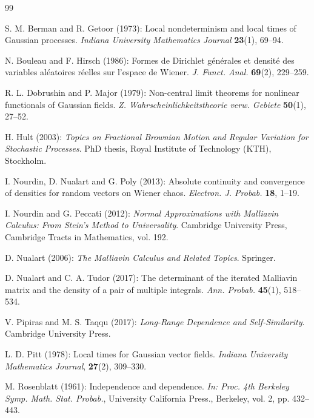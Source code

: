 \documentclass[a4paper,10pt]{article}
\theoremstyle{definition}
\theoremstyle{plain}
\newcommand\1{\mathbbm{1}}
\begin{document}
\begin{thebibliography}{99}

\rm  S. M. Berman and R. Getoor  (1973):
\rm Local nondeterminism and local times of Gaussian processes. 
\rm {\it Indiana University Mathematics Journal}  {\bf 23}(1), 69--94.
  
\rm N. Bouleau and F. Hirsch (1986):
\rm Formes de Dirichlet générales et densité des variables aléatoires réelles sur l’espace de Wiener.
\rm {\it J. Funct. Anal.} {\bf 69}(2), 229--259.

\rm R. L. Dobrushin and P. Major (1979): 
\rm Non-central limit theorems for nonlinear functionals of Gaussian fields.  
\rm {\it Z. Wahrscheinlichkeitstheorie verw. Gebiete} {\bf 50}(1), 27--52.

\rm H. Hult (2003):
\rm {\it Topics on Fractional Brownian Motion and Regular Variation for Stochastic Processes}.
\rm PhD thesis, Royal Institute of Technology (KTH), Stockholm.


\rm I. Nourdin, D. Nualart and G. Poly (2013): 
\rm Absolute continuity and convergence of densities for random vectors on Wiener chaos.  
\rm {\it Electron. J. Probab.} {\bf 18}, 1--19.  

\rm I. Nourdin and G. Peccati (2012):
\rm {\it Normal Approximations with Malliavin Calculus: From Stein's Method to Universality}.
\rm Cambridge University Press, Cambridge Tracts in Mathematics, vol. 192.

\rm D. Nualart (2006):  
\rm {\it The Malliavin Calculus and Related Topics}.  
\rm Springer.

\rm D. Nualart and C. A. Tudor (2017): 
\rm The determinant of the iterated Malliavin matrix and the density of a pair of multiple integrals.
\rm {\it Ann. Probab.} {\bf 45}(1), 518--534.  

\rm V. Pipiras and M. S. Taqqu (2017): 
\rm {\it Long-Range Dependence and Self-Similarity}.  
\rm Cambridge University Press.

\rm L. D.  Pitt (1978): 
\rm Local times for Gaussian vector fields.
\rm {\it Indiana University Mathematics Journal}, {\bf 27}(2), 309--330.

\rm M. Rosenblatt (1961):
\rm  Independence and dependence.
\rm {\it In: Proc. 4th Berkeley Symp. Math. Stat. Probab.}, University California Press., Berkeley, vol. 2, pp. 432--443.


\end{thebibliography}
\end{document}
